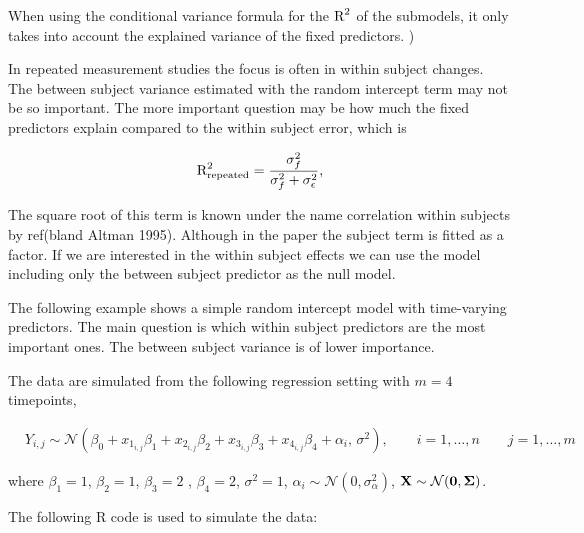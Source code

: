 \documentclass[11pt,a4paper,twoside]{book}
\begin{document}
When using the conditional variance formula for the $\text{R}^2$ of the submodels, it only takes into account the explained variance of the fixed predictors. )


In repeated measurement studies the focus is often in within subject changes. The between subject variance estimated with the random intercept term may not be so important. The more important question may be how much the fixed predictors explain compared to the within subject error, which is

   \begin{align} 
\text{R}^2_{\text{repeated}} = \frac{\sigma_{f}^2}{\sigma_{f}^2  + \sigma_{\epsilon}^2},
\end{align}

The square root of this term is known under the name correlation within subjects by ref(bland Altman 1995). Although in the paper the subject term is fitted as a factor. If we are interested in the within subject effects we can use the model including only the between subject predictor as the null model.

The following example shows a simple random intercept model with time-varying predictors. The main question is which within subject predictors are the most important ones. The between subject variance is of lower importance. 

The data are simulated from the following regression setting with $m = 4$ timepoints,

\begin{align} 
&Y_{i,j} \sim \mathcal{N}(\beta_{0}+x_{1_{i,j}} \beta_{1}+x_{2_{i,j}} \beta_{2}+x_{3_{i,j}} \beta_{3}+x_{4_{i,j}} \beta_{4} + \alpha_{i}, \, \sigma^2), \qquad i = 1, \dots, n \qquad j = 1, \dots, m
\end{align} 

where $\beta_{1} = 1$, $\beta_{2} = 1$,  $\beta_{3} = 2$ , $\beta_{4}=2$, $\sigma^2 = 1$, $\alpha_{i} \sim \mathcal{N}(0, \sigma_{\alpha}^2)$, ${\mathbf{X}} \sim \mathcal{N}({\mathbf{0}}, {\boldsymbol{\Sigma}}{})$.

The following R code is used to simulate the data:
\end{document}
